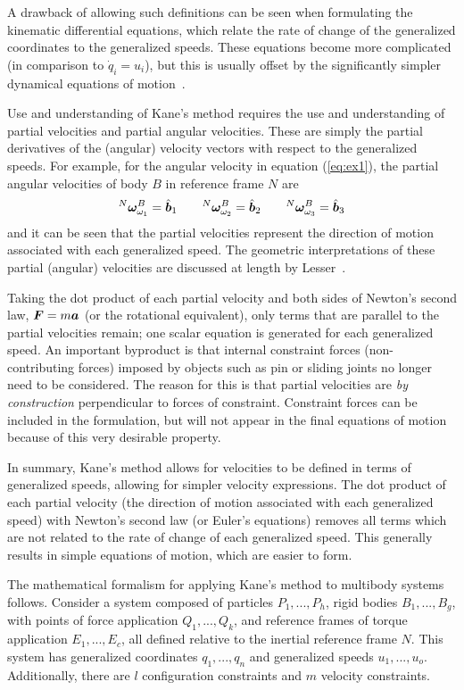 A drawback of allowing such definitions can be seen when formulating the
kinematic differential equations, which relate the rate of change of the
generalized coordinates to the generalized speeds. These equations become more
complicated (in comparison to $\dot{q}_i = u_i$), but this is usually offset by
the significantly simpler dynamical equations of motion~\cite{Mitiguy1996}.

Use and understanding of Kane's method requires the use and understanding of
partial velocities and partial angular velocities. These are simply the
partial derivatives of the (angular) velocity vectors with respect to the
generalized speeds. For example, for the angular velocity in equation
(\ref{eq:ex1}), the partial angular velocities of body $B$ in reference frame
$N$ are
\[
  {^N}\boldsymbol{\omega}^B_{\omega_1} = \hat{\boldsymbol{b}}_{1} \quad \quad
  {^N}\boldsymbol{\omega}^B_{\omega_2} = \hat{\boldsymbol{b}}_{2} \quad \quad
  {^N}\boldsymbol{\omega}^B_{\omega_3} = \hat{\boldsymbol{b}}_{3}
\]
and it can be seen that the partial velocities represent the direction of
motion associated with each generalized speed. The geometric interpretations of
these partial (angular) velocities are discussed at length by
Lesser~\cite{Lesser1992}.

Taking the dot product of each partial velocity and both sides of Newton's
second law, $\boldsymbol{F}=m\boldsymbol{a}$ (or the rotational equivalent), only terms that
are parallel to the partial velocities remain; one scalar equation is generated
for each generalized speed. An important byproduct is that internal constraint forces
(non-contributing forces) imposed by objects such as pin or sliding joints no
longer need to be considered. The reason for this is that partial velocities
are \textit{by construction} perpendicular to forces of constraint. Constraint
forces can be included in the formulation, but will not appear in the final
equations of motion because of this very desirable property.

In summary, Kane's method allows for velocities to be defined in terms of
generalized speeds, allowing for simpler velocity expressions.  The dot product
of each partial velocity (the direction of motion associated with each
generalized speed) with Newton's second law (or Euler's equations) removes all
terms which are not related to the rate of change of each generalized speed.
This generally results in simple equations of motion, which are easier to form.

The mathematical formalism for applying Kane's method to multibody systems
follows. Consider a system composed of particles $P_1,...,P_h$, rigid bodies
$B_1,...,B_g$, with points of force application $Q_1,...,Q_k$, and reference
frames of torque application $E_1,...,E_c$, all defined relative to the
inertial reference frame $N$. This system has generalized coordinates
$q_1,...,q_n$ and generalized speeds $u_1,...,u_o$. Additionally, there are $l$
configuration constraints and $m$ velocity constraints.

